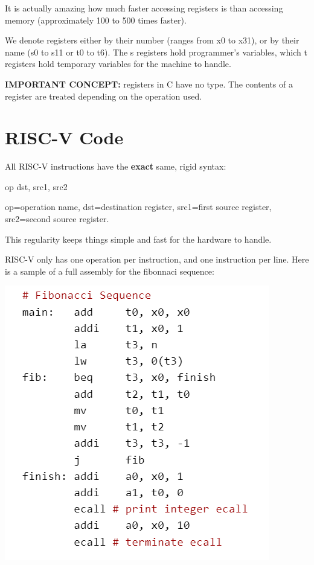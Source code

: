 \documentclass[letterpaper]{article}
\theoremstyle{remark}
\begin{document}
It is actually amazing how much faster accessing registers is than accessing memory (approximately 100 to 500 times faster).

We denote registers either by their number (ranges from x0 to x31), or by their name (s0 to s11 or t0 to t6). The s registers hold programmer's variables, which t registers hold temporary variables for the machine to handle.

\textbf{IMPORTANT CONCEPT:} registers in C have no type. The contents of a register are treated depending on the operation used.

\section{RISC-V Code}
All RISC-V instructions have the \textbf{exact} same, rigid syntax: 

\begin{center}
op dst, src1, src2
\end{center}

op=operation name, dst=destination register, src1=first source register, src2=second source register.

This regularity keeps things simple and fast for the hardware to handle.

RISC-V only has one operation per instruction, and one instruction per line. Here is a sample of a full assembly for the fibonnaci sequence:
\begin{center}
\includegraphics[]{assembly}
\end{center}
\end{document}
